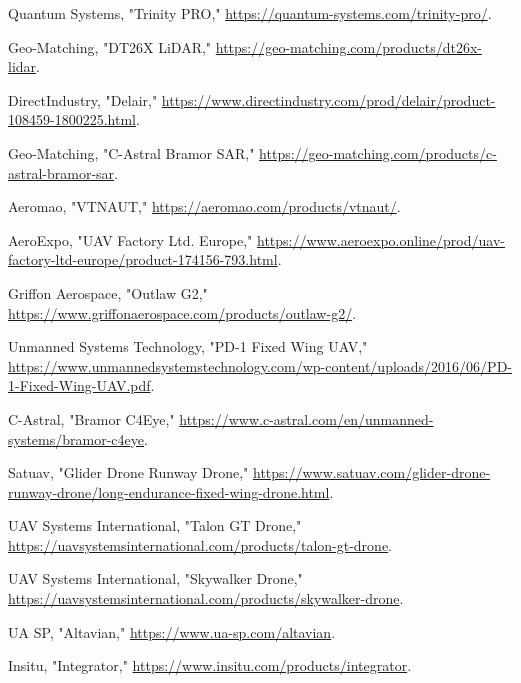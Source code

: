 \documentclass[12pt]{article}
\begin{document}
\begin{thebibliography}{99}
		Quantum Systems, "Trinity PRO," \url{https://quantum-systems.com/trinity-pro/}.
		
		Geo-Matching, "DT26X LiDAR," \url{https://geo-matching.com/products/dt26x-lidar}.
		
		DirectIndustry, "Delair," \url{https://www.directindustry.com/prod/delair/product-108459-1800225.html}.
		
		Geo-Matching, "C-Astral Bramor SAR," \url{https://geo-matching.com/products/c-astral-bramor-sar}.
		
		Aeromao, "VTNAUT," \url{https://aeromao.com/products/vtnaut/}.
		
		AeroExpo, "UAV Factory Ltd. Europe," \url{https://www.aeroexpo.online/prod/uav-factory-ltd-europe/product-174156-793.html}.
		
		Griffon Aerospace, "Outlaw G2," \url{https://www.griffonaerospace.com/products/outlaw-g2/}.
		
		Unmanned Systems Technology, "PD-1 Fixed Wing UAV," \url{https://www.unmannedsystemstechnology.com/wp-content/uploads/2016/06/PD-1-Fixed-Wing-UAV.pdf}.
		
		C-Astral, "Bramor C4Eye," \url{https://www.c-astral.com/en/unmanned-systems/bramor-c4eye}.
		
		Satuav, "Glider Drone Runway Drone," \url{https://www.satuav.com/glider-drone-runway-drone/long-endurance-fixed-wing-drone.html}.
		
		UAV Systems International, "Talon GT Drone," \url{https://uavsystemsinternational.com/products/talon-gt-drone}.
		
		UAV Systems International, "Skywalker Drone," \url{https://uavsystemsinternational.com/products/skywalker-drone}.
		
		UA SP, "Altavian," \url{https://www.ua-sp.com/altavian}.
		
		Insitu, "Integrator," \url{https://www.insitu.com/products/integrator}.
		
	\end{thebibliography}
	
	\newpage
	
\end{document}
